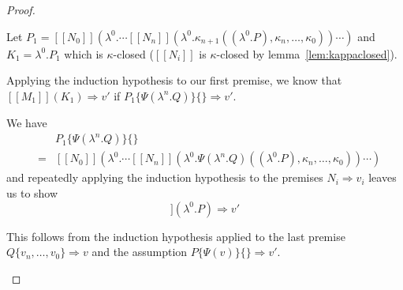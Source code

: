 \documentclass[a4paper,11pt,draft]{article}
\newcommand{\kw}[1]{\mathtt{#1}}
\begin{document}
\begin{proof}
\begin{description}

Let $P_{1} = [\![N_{0}]\!](\lambda^{0}. \cdots [\![N_{n}]\!](\lambda^{0}.\kappa_{n+1}((\lambda^{0}.P), \kappa_{n}, \ldots, \kappa_{0})) \cdots )$ and $K_{1} = \lambda^{0}.P_{1}$ which is $\kappa$-closed ($[\![N_{i}]\!]$ is $\kappa$-closed by lemma~\ref{lem:kappaclosed}).

Applying the induction hypothesis to our first premise, we know that $[\![M_{1}]\!](K_{1}) \Rightarrow v'$ if $P_{1}\{\Psi(\lambda^{n}.Q)\}\{\} \Rightarrow v'$.

We have
\begin{eqnarray*}
&   & P_{1}\{\Psi(\lambda^{n}.Q)\}\{\} \\
& = & [\![N_{0}]\!](\lambda^{0}. \cdots [\![N_{n}]\!](\lambda^{0}.\Psi(\lambda^{n}.Q)((\lambda^{0}.P), \kappa_{n}, \ldots, \kappa_{0})) \cdots )
\end{eqnarray*}
and repeatedly applying the induction hypothesis to the premises $N_{i} \Rightarrow v_{i}$ leaves us to show
\begin{displaymath}
[\![Q\{v_{n}, \ldots, v_{0}\}]\!] (\lambda^{0}.P) \Rightarrow v'
\end{displaymath}

This follows from the induction hypothesis applied to the last premise
$Q\{v_{n}, \ldots, v_{0}\} \Rightarrow v$ and the assumption $P\{\Psi(v)\}\{\}
\Rightarrow v'$.






\end{description}
\end{proof}
\end{document}
